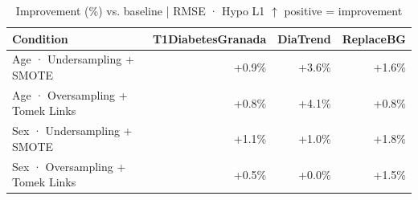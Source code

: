 \begin{table}[htbp]
\centering
\small
\caption{Improvement (\%) vs. baseline  |  RMSE · Hypo L1  $\uparrow$ positive = improvement}
\label{tab:delta_rmse_tbr_1_family_mechanism_random+guided}
\begin{tabular}{lrrr}
\toprule
\textbf{Condition} & \textbf{T1DiabetesGranada} & \textbf{DiaTrend} & \textbf{ReplaceBG} \\
\midrule
Age · Undersampling + SMOTE & \textcolor{OliveGreen}{+0.9\%} & \textcolor{OliveGreen}{+3.6\%} & \textcolor{OliveGreen}{+1.6\%} \\
Age · Oversampling + Tomek Links & \textcolor{OliveGreen}{+0.8\%} & \textcolor{OliveGreen}{+4.1\%} & \textcolor{OliveGreen}{+0.8\%} \\
\midrule
Sex · Undersampling + SMOTE & \textcolor{OliveGreen}{+1.1\%} & \textcolor{OliveGreen}{+1.0\%} & \textcolor{OliveGreen}{+1.8\%} \\
Sex · Oversampling + Tomek Links & \textcolor{OliveGreen}{+0.5\%} & \textcolor{OliveGreen}{+0.0\%} & \textcolor{OliveGreen}{+1.5\%} \\
\bottomrule
\end{tabular}
\end{table}